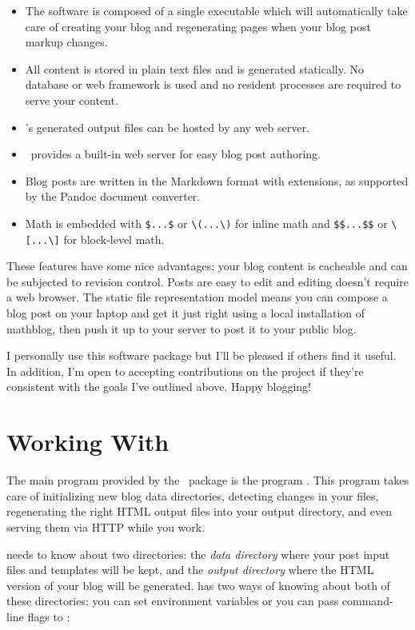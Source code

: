 \documentclass[11pt, letterpaper, oneside, titlepage]{book}
\begin{document}
\begin{itemize}
\item{The software is composed of a single executable which will
  automatically take care of creating your blog and regenerating pages
  when your blog post markup changes.}
\item{All content is stored in plain text files and is generated
  statically.  No database or web framework is used and no resident
  processes are required to serve your content.}
\item{\mathblog's generated output files can be hosted by any web
  server.}
\item{\mathblog\ provides a built-in web server for easy blog post
  authoring.}
\item{Blog posts are written in the Markdown format with extensions,
  as supported by the Pandoc document converter.}
\item{Math is embedded with \verb|$...$| or \verb|\(...\)| for inline
  math and \verb|$$...$$| or \verb|\[...\]| for block-level math.}
\end{itemize}

These features have some nice advantages; your blog content is
cacheable and can be subjected to revision control.  Posts are easy to
edit and editing doesn't require a web browser.  The static file
representation model means you can compose a blog post on your laptop
and get it just right using a local installation of mathblog, then
push it up to your server to post it to your public blog.

I personally use this software package but I'll be pleased if others
find it useful.  In addition, I'm open to accepting contributions on
the project if they're consistent with the goals I've outlined above.
Happy blogging!

\chapter{Working With \mathblog}

The main program provided by the \mathblog\ package is the program
.  This program takes care of initializing new blog data
directories, detecting changes in your files, regenerating the right
HTML output files into your output directory, and even serving them
via HTTP while you work.

 needs to know about two directories: the \textit{data
  directory} where your post input files and templates will be kept,
and the \textit{output directory} where the HTML version of your blog
will be generated.   has two ways of knowing about both of
these directories: you can set environment variables or you can pass
command-line flags to :
\end{document}
